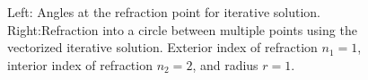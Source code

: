 \begin{figure}[h] 
   \centering
   \caption{Left: Angles at the refraction point for iterative solution. Right:Refraction into a circle between multiple points using the vectorized iterative solution. Exterior index of refraction $n_1 = 1$, interior index of refraction $n_2 = 2$, and radius $r = 1$.  }
\end{figure}



%
%
%


